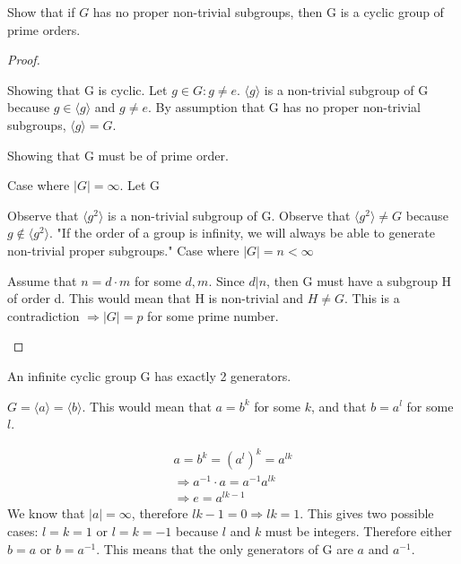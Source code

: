 \documentclass[11pt]{scrartcl}
\begin{document}
\begin{exercise}
  Show that if $G$ has no proper non-trivial subgroups, then G is a cyclic group of prime orders.
  \begin{proof}
    \begin{enumerate}[label=(\alph*)]
      \ii[]
      \ii
      Showing that G is cyclic. Let $g \in G: g \neq e$. $\langle g \rangle$ is a non-trivial subgroup of G because $g \in \langle g \rangle$ and $g \neq e$. By assumption that G has no proper non-trivial subgroups, $\langle g \rangle = G$.

      \ii
      Showing that G must be of prime order.
      \begin{enumerate}
        \ii
        Case where $|G| = \infty$. Let G

        Observe that $\langle g^2 \rangle$ is a non-trivial subgroup of G.
        Observe that $\langle g^2 \rangle \neq G$ because $g \notin \langle g^2 \rangle$.
        "If the order of a group is infinity, we will always be able to generate non-trivial proper subgroups."
        \ii
        Case where $|G| = n < \infty$

        Assume that $n = d \cdot m$ for some $d, m$. Since $d | n$, then G must have a subgroup H of order d. This would mean that H is non-trivial and $H \neq G$. This is a contradiction $\Rightarrow |G| = p$ for some prime number.
      \end{enumerate}
  
    \end{enumerate}
  \end{proof}
\end{exercise}

\begin{exercise}
  An infinite cyclic group G has exactly 2 generators.

  $G = \langle a \rangle = \langle b \rangle$. This would mean that $a = b^k$ for some $k$, and that $b = a^l$ for some $l$.

   \begin{gather*}
     a = b^k = (a^l)^k = a^{lk} \\
     \Rightarrow a^{-1} \cdot a = a^{-1} a^{lk} \\
     \Rightarrow e = a^{lk - 1}
  \end{gather*}
  We know that $|a| = \infty$, therefore $lk - 1 = 0 \Rightarrow lk = 1$. This gives two possible cases: $l = k = 1$ or $l = k = -1$ because $l$ and $k$ must be integers. Therefore either $b = a$ or $b = a^{-1}$. This means that the only generators of G are $a$ and $a^{-1}$.
\end{exercise}
\end{document}
